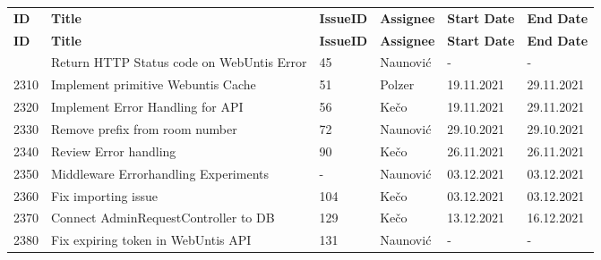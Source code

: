 
\begin{longtable}{|p{}|p{}|p{}|p{}|p{}|p{}|} \hline
    \textbf{ID} & \textbf{Title} & \textbf{Issue\-ID} & \textbf{Assignee} & \textbf{Start Date} & \textbf{End\- Date} \\ \hhline{|=|=|=|=|=|=|}
    \endfirsthead
    \hline
    \textbf{ID} & \textbf{Title} & \textbf{Issue\-ID} & \textbf{Assignee} & \textbf{Start Date} & \textbf{End\- Date} \\ \hhline{|=|=|=|=|=|=|}
    \endhead
    2300 & Return HTTP Status code on WebUntis Error & 45 & Naunović & - & - \\ \hline
    2310 & Implement primitive Webuntis Cache & 51 & Polzer & 19.11.2021 & 29.11.2021 \\ \hline
    2320 & Implement Error Handling for API & 56 & Kečo & 19.11.2021 & 29.11.2021 \\ \hline
    2330 & Remove prefix from room number & 72 & Naunović & 29.10.2021 & 29.10.2021 \\ \hline
    2340 & Review Error handling & 90 & Kečo & 26.11.2021 & 26.11.2021 \\ \hline
    2350 & Middleware Errorhandling Experiments & - & Naunović & 03.12.2021 & 03.12.2021 \\ \hline
    2360 & Fix importing issue & 104 & Kečo & 03.12.2021 & 03.12.2021 \\ \hline
    2370 & Connect AdminRequestController to DB & 129 & Kečo & 13.12.2021 & 16.12.2021 \\ \hline
    2380 & Fix expiring token in WebUntis API & 131 & Naunović & - & - \\ \hline
\end{longtable}


